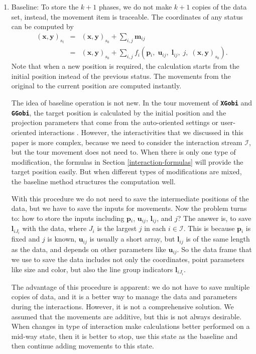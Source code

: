 \documentclass[12pt]{article}
\begin{document}
\begin{enumerate}
\item Baseline: To store the $k+1$ phases, we do not make $k+1$
copies of the data set, instead, the movement item is traceable. The
coordinates of any status can be computed by 
\begin{eqnarray*}
 (\mathbf{x},\mathbf{y})_{s_{t}} & = &  (\mathbf{x},\mathbf{y})_{s_{0}}+\sum_{i,j}\mathbf{m}{}_{ij}\\
 & = &  (\mathbf{x},\mathbf{y})_{s_{0}}+\sum_{i,j}f_{i} (\mathbf{p}{}_{i},\;\mathbf{u}{}_{ij},\;\mathbf{l}_{ij},\; j,\; (\mathbf{x},\mathbf{y})_{s_0}).
\end{eqnarray*}
Note that when a new position is required, the calculation starts
from the initial position instead of the previous status. The movements
from the original to the current position are computed instantly.

The idea of baseline operation is not new. In the tour movement
of \texttt{\textbf{XGobi}} and \texttt{\textbf{GGobi}}, the target
position is calculated by the initial position and the projection
parameters that come from the auto-oriented settings or
user-oriented interactions \citep{cook1995grand, cook1997manual}.
However, the interactivities that we discussed in this paper is
more complex, because we need to consider the interaction stream
$\mathcal{I}$, but the tour movement does not need to.
When there is only one type of modification, the formulas in
Section \ref{interaction-formulas} will provide the target
position easily. But when different types of modifications
are mixed, the baseline method structures the computation well.

With this procedure we do not need to save the intermediate
positions of the data, but we have to save the inputs for movements.
Now the problem turns to: how to store the inputs including
$\mathbf{p}{}_{i}$, $\mathbf{u}{}_{ij}$, $\mathbf{l}_{ij}$, and $j$? The answer is,
to save $\mathbf{l}_{iJ_i}$ with the data, where $J_i$ is the largest
$j$ in each $i \in \mathcal{I}$. This is because $\mathbf{p}{}_{i}$
is fixed and $j$ is known, $\mathbf{u}{}_{ij}$ is usually a short array,
but $\mathbf{l}_{ij}$ is of the same length as the data, and depends
on other parameters like $\mathbf{u}{}_{ij}$. So the data frame that
we use to save the data includes not only the coordinates, point parameters
like size and color, but also the line group indicators $\mathbf{l}_{iJ_i}$.

The advantage of this procedure is apparent: we do not have
to save multiple copies of data, and it is a better way to manage
the data and parameters during the interactions. However, it is not a comprehensive solution. We assumed that the movements are additive, but this is not always desirable. When changes in type of interaction make calculations better performed on a mid-way state, then it is better to stop, use this state as the baseline and then continue adding movements to this state.


\end{enumerate}
\end{document}
